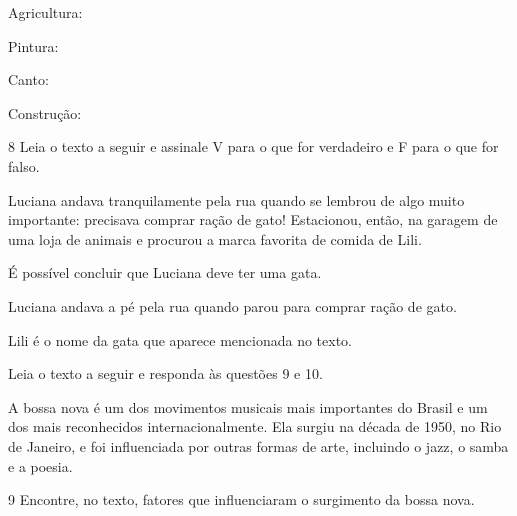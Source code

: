 \begin{escolha}
\item Agricultura: 

\item Pintura: 

\item Canto: 

\item Construção: 
\end{escolha}

\num{8} Leia o texto a seguir e assinale V para o que for verdadeiro e F para o que for falso.

\begin{myquote}
Luciana andava tranquilamente pela rua quando se lembrou de algo muito
importante: precisava comprar ração de gato! Estacionou, então, na
garagem de uma loja de animais e procurou a marca favorita de comida de
Lili.

\end{myquote}

\begin{boxlist}
 É possível concluir que Luciana deve ter uma gata.

 Luciana andava a pé pela rua quando parou para comprar ração de gato.

 Lili é o nome da gata que aparece mencionada no texto.
\end{boxlist}


Leia o texto a seguir e responda às questões 9 e 10.

\begin{myquote}
A bossa nova é um dos movimentos musicais mais importantes do Brasil e
um dos mais reconhecidos internacionalmente. Ela surgiu na década de
1950, no Rio de Janeiro, e foi influenciada por outras formas de arte,
incluindo o jazz, o samba e a poesia.

\end{myquote}

\pagebreak
\num{9} Encontre, no texto, fatores que influenciaram o surgimento da bossa nova.



